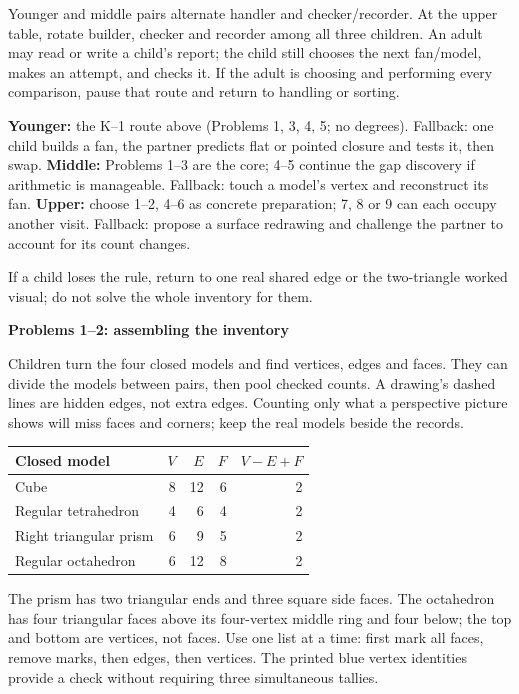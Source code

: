 \documentclass[11pt,letterpaper]{article}
\newcommand{\titleline}[1]{\par{\Large\bfseries #1}\par\vspace{4pt}}
\newcommand{\sub}[1]{\par\vspace{3pt}{\bfseries #1}\par}
\begin{document}
\sub{Who does what}
Younger and middle pairs alternate handler and checker/recorder. At the upper table, rotate builder, checker and recorder among all three children. An adult may read or write a child's report; the child still chooses the next fan/model, makes an attempt, and checks it. If the adult is choosing and performing every comparison, pause that route and return to handling or sorting.

\sub{First routes and fallbacks}
\textbf{Younger:} the K--1 route above (Problems 1, 3, 4, 5; no degrees). Fallback: one child builds a fan, the partner predicts flat or pointed closure and tests it, then swap. \textbf{Middle:} Problems 1--3 are the core; 4--5 continue the gap discovery if arithmetic is manageable. Fallback: touch a model's vertex and reconstruct its fan. \textbf{Upper:} choose 1--2, 4--6 as concrete preparation; 7, 8 or 9 can each occupy another visit. Fallback: propose a surface redrawing and challenge the partner to account for its count changes.\par
If a child loses the rule, return to one real shared edge or the two-triangle worked visual; do not solve the whole inventory for them.

\newpage
\titleline{Problems 1--2: assembling the inventory}
\sub{Problem 1 / student p.1 / concrete core}
Children turn the four closed models and find vertices, edges and faces. They can divide the models between pairs, then pool checked counts. A drawing's dashed lines are hidden edges, not extra edges. Counting only what a perspective picture shows will miss faces and corners; keep the real models beside the records.

\begin{center}
\begin{tabular}{|l|r|r|r|r|}\hline
Closed model & $V$ & $E$ & $F$ & $V-E+F$\\\hline
Cube & 8 & 12 & 6 & 2\\
Regular tetrahedron & 4 & 6 & 4 & 2\\
Right triangular prism & 6 & 9 & 5 & 2\\
Regular octahedron & 6 & 12 & 8 & 2\\\hline
\end{tabular}
\end{center}
The prism has two triangular ends and three square side faces. The octahedron has four triangular faces above its four-vertex middle ring and four below; the top and bottom are vertices, not faces. Use one list at a time: first mark all faces, remove marks, then edges, then vertices. The printed blue vertex identities provide a check without requiring three simultaneous tallies.
\end{document}
